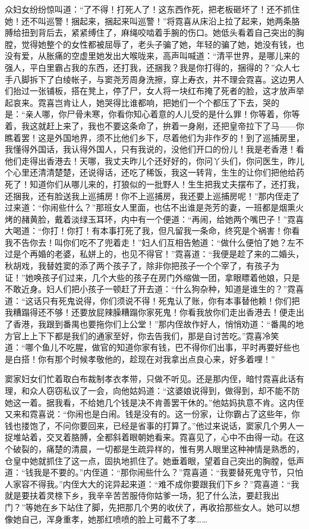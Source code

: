 \par 众妇女纷纷惊叫道：“了不得！打死人了！这东西作死，把老板砸坏了！还不抓住她！还不叫巡警！捆起来，捆起来叫巡警！”将霓喜从床沿上拉了起来，她两条胳膊给扭到背后去，紧紧缚住了，麻绳咬啮着手腕的伤口。她低头看着自己突出的胸膛，觉得她整个的女性都被屈辱了，老头子骗了她，年轻的骗了她，她没有钱，也没有爱，从胀痛的空虚里她发出大喉咙来，高声叫喊道：“清平世界，是哪儿来的强人，平白里霸占我的东西，还打我，还捆我？我是你打得的，捆得的？”众人七手八脚拆下了白绫帐子，与窦尧芳周身洗擦，穿上寿衣，并不理会霓喜。这边男人们抬过一张铺板，搭在凳上，停了尸，女人将一块红布掩了死者的脸，这才放声举起哀来。霓喜岂肯让人，她哭得比谁都响，把她们一个个都压了下去，哭的是：“亲人哪，你尸骨未寒，你看你知心着意的人儿受的是什么罪！你等着，你等着，我这就赶上来了，我也不要这条命了，拚着一身剐，还把皇帝拉下了马——你瞧着罢！这是外国地界，须不比他们乡下，尽着他们为非作歹的！到了巡捕房里，我懂得外国话，我认得外国人，只有我说的，没他们开口的份儿！我是老香港！看他们走得出香港去！天哪，我丈夫昨儿个还好好的，你问丫头们，你问医生，昨儿个心里还清清楚楚，还说得话，还吃了稀饭，我这一转背，生生的让你们把他给药死了！知道你们从哪儿来的，打狼似的一批野人！生生把我丈夫摆布了，还打我，还捆我，还有脸送我上巡捕房！你不上巡捕房，我还要上巡捕房呢！”那内侄走了过来道：“你闹些什么？”那班女人里面，也估不出谁是尧芳的妻，一班都是烟熏火烤的赭黄脸，戴着淡绿玉耳环，内中有一个便道：“再闹，给她两个嘴巴子！”霓喜大喝道：“你打！你打！有本事打死了我，但凡留我一条命，终究是个祸害！你看我不告你去！叫你们吃不了兜着走！”妇人们互相告勉道：“做什么便怕了她？左不过是个再婚的老婆，私姘上的，也见不得官！”霓喜道：“我便是趁了来的二婚头，秋胡戏，我替姓窦的添了两个孩子了，除非你把孩子一个个宰了，有孩子为证！”她唤孩子们过来，几个大些的孩子在房门外缩做一团，拿眼瞟着他娘，只是不敢近身。妇人们把小孩子一顿赶了开去道：“什么狗杂种，知道是谁生的？”霓喜道：“这话只有死鬼说得，你们须说不得！死鬼认了账，你有本事替他赖！你们把我糟蹋得还不够！还要放屁辣臊糟蹋你家死鬼！你看我放你们走出香港去！便走出了香港，我跟到番禺也要拖你们上公堂！”那内侄故作好人，悄悄劝道：“番禺的地方官上上下下都是我们的通家至好，你去告我们，那是自讨苦吃。”霓喜冷笑道：“哪个鱼儿不吃腥，做官的知道你家有钱，巴不得你们出事，平时再要好些也是白搭！你有那个时候孝敬他的，趁现在对我拿出点良心来，好多着哩！”
\par 窦家妇女们忙着取白布裁制孝衣孝带，只做不听见。还是那内侄，暗忖霓喜此话有理，和众人窃窃私议了一会，向他姑妈道：“这婆娘说得到，做得到，却不能不防她这一着。据我看，不给她几个钱是决不肯善罢干休的。”他姑妈执意不肯。这内侄又来和霓喜说：“你闹也是白闹。钱是没有的。这一份家，让你霸占了这些年，你钱也搂饱了，不问你要回来，已经是省事的打算了。”他过来说话，窦家几个男人一捉堆站着，交叉着胳膊，全都斜着眼朝她看来。霓喜见了，心中不由得一动。在这个破裂的，痛楚的清晨，一切都是生疏异样的，惟有男人眼里这种神情是熟悉的，仓皇中她就抓住了这一点，固执地抓住了。她垂着眼，望着自己突出的胸膛，低声道：“钱我是不要的。”内侄道：“那你闹些什么？”霓喜道：“我要替死鬼守节，只怕人家容不得我。”内侄大大的诧异起来道：“难不成你要跟我们下乡？”霓喜道：“我就是要扶着灵榇下乡，我辛辛苦苦服侍你姑爹一场，犯了什么法，要赶我出门？”等她在乡下站住了脚，先把那几个男的收伏了，再收拾那些女人。她可以想像她自己，浑身重孝，她那红喷喷的脸上可戴不了孝……

